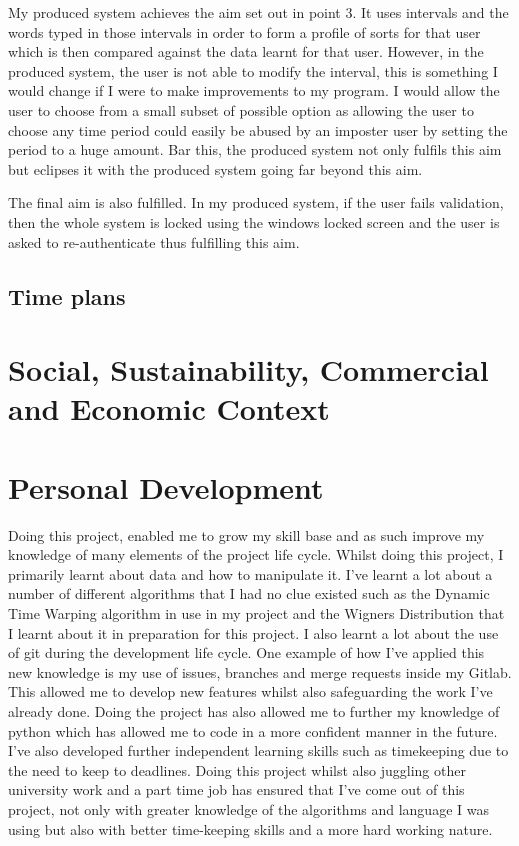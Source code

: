 \documentclass[10pt,a4paper]{report}
\begin{document}
My produced system achieves the aim set out in point 3. It uses intervals and the words typed in those intervals in order to form a profile of sorts for that user which is then compared against the data learnt for that user. However, in the produced system, the user is not able to modify the interval, this is something I would change if I were to make improvements to my program. I would allow the user to choose from a small subset of possible option as allowing the user to choose any time period could easily be abused by an imposter user by setting the period to a huge amount. Bar this, the produced system not only fulfils this aim but eclipses it with the produced system going far beyond this aim.

The final aim is also fulfilled. In my produced system, if the user fails validation, then the whole system is locked using the windows locked screen and the user is asked to re-authenticate thus fulfilling this aim.


\subsection{Time plans}

\section{Social, Sustainability, Commercial and Economic Context}

\section{Personal Development}

Doing this project, enabled me to grow my skill base and as such improve my knowledge of many elements of the project life cycle. Whilst doing this project, I primarily learnt about data and how to manipulate it. I've learnt a lot about a number of different algorithms that I had no clue existed such as the Dynamic Time Warping algorithm in use in my project and the Wigners Distribution that I learnt about it in preparation for this project. I also learnt a lot about the use of git during the development life cycle. One example of how I've applied this new knowledge is my use of issues, branches and merge requests inside my Gitlab. This allowed me to develop new features whilst also safeguarding the work I've already done. Doing the project has also allowed me to further my knowledge of python which has allowed me to code in a more confident manner in the future. I've also developed further independent learning skills such as timekeeping due to the need to keep to deadlines. Doing this project whilst also juggling other university work and a part time job has ensured that I've come out of this project, not only with greater knowledge of   the algorithms and language I was using but also with better time-keeping skills and a more hard working nature.
\end{document}
